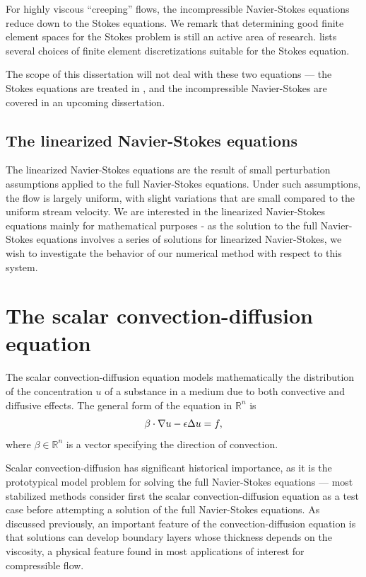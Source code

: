 For highly viscous ``creeping'' flows, the incompressible Navier-Stokes equations reduce down to the Stokes equations. We remark that determining good finite element spaces for the Stokes problem is still an active area of research. \cite{stokesFEM} lists several choices of finite element discretizations suitable for the Stokes equation. 

The scope of this dissertation will not deal with these two equations --- the Stokes equations are treated in \cite{stokesDPG}, and the incompressible Navier-Stokes are covered in an upcoming dissertation. 

\subsection{The linearized Navier-Stokes equations}

The linearized Navier-Stokes equations are the result of small perturbation assumptions applied to the full Navier-Stokes equations. Under such assumptions, the flow is largely uniform, with slight variations that are small compared to the uniform stream velocity. We are interested in the linearized Navier-Stokes equations mainly for mathematical purposes - as the solution to the full Navier-Stokes equations involves a series of solutions for linearized Navier-Stokes, we wish to investigate the behavior of our numerical method with respect to this system.  

\section{The scalar convection-diffusion equation}

The scalar convection-diffusion equation models mathematically the distribution of the concentration $u$ of a substance in a medium due to both convective and diffusive effects. The general form of the equation in $\mathbb{R}^n$ is 
\[
\beta\cdot \grad u - \epsilon \Delta u = f,
\]
where $\beta \in \mathbb{R}^n$ is a vector specifying the direction of convection.

Scalar convection-diffusion has significant historical importance, as it is the prototypical model problem for solving the full Navier-Stokes equations --- most stabilized methods consider first the scalar convection-diffusion equation as a test case before attempting a solution of the full Navier-Stokes equations. As discussed previously, an important feature of the convection-diffusion equation is that solutions can develop boundary layers whose thickness depends on the viscosity, a physical feature found in most applications of interest for compressible flow. 

